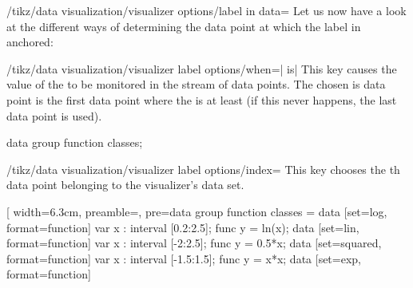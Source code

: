 \begin{key}{/tikz/data visualization/visualizer options/label in data=}
    Let us now have a look at the different ways of determining the data point
    at which the label in anchored:
    \begin{key}{/tikz/data visualization/visualizer label options/when=| is|}
        This key causes the value of the  to be monitored in
        the stream of data points. The chosen is data point is the first data
        point where the  is at least  (if this
        never happens, the last data point is used).
\begin{codeexample}[
    width=6.3cm,
    preamble={\usetikzlibrary{datavisualization.formats.functions}},
    pre={\tikz \datavisualization data group {function classes} = {
  data [set=log, format=function] {
    var x : interval [0.2:2.5];
    func y = ln(\value x);
  }
  data [set=lin, format=function] {
    var x : interval [-2:2.5];
    func y = 0.5*\value x;
  }
  data [set=squared, format=function] {
    var x : interval [-1.5:1.5];
    func y = \value x*\value x;
  }
  data [set=exp, format=function] {
    var x : interval [-2.5:1];
    func y = exp(\value x);
  }
};},
]
\tikz \datavisualization [
  school book axes,
  x axis={label=$x$},
  visualize as smooth line/.list={log, lin, squared, exp},
  log=    {label in data={text'=$\log x$, when=y is -1,
                          text colored}},
  lin=    {label in data={text=$x/2$,     when=x is 2}},
  squared={label in data={text=$x^2$,     when=x is 1.1}},
  exp=    {label in data={text=$e^x$,     when=x is -2,
                          text colored}},
  style sheet=vary hue]
data group {function classes};
\end{codeexample}
    \end{key}
    \begin{key}{/tikz/data visualization/visualizer label options/index=}
        This key chooses the th data point belonging to the
        visualizer's data set.
\begin{codeexample}[
    width=6.3cm,
    preamble={\usetikzlibrary{datavisualization.formats.functions}},
    pre={\tikz \datavisualization data group {function classes} = {
  data [set=log, format=function] {
    var x : interval [0.2:2.5];
    func y = ln(\value x);
  }
  data [set=lin, format=function] {
    var x : interval [-2:2.5];
    func y = 0.5*\value x;
  }
  data [set=squared, format=function] {
    var x : interval [-1.5:1.5];
    func y = \value x*\value x;
  }
  data [set=exp, format=function] {
}}}
\end{codeexample}
\end{key}
\end{key}

